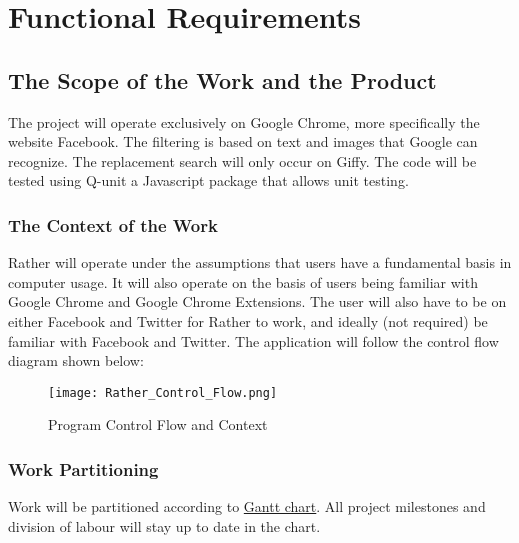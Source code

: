 \documentclass[12pt, titlepage]{article}
\begin{document}
\section{Functional Requirements}


\subsection{The Scope of the Work and the Product}
The project will operate exclusively on Google Chrome, more specifically the website Facebook. The filtering is based on text and images that Google can recognize. The replacement search will only occur on Giffy. The code will be tested using Q-unit a Javascript package that allows unit testing.

\subsubsection{The Context of the Work}
Rather will operate under the assumptions that users have a fundamental basis in computer usage. It will also operate on the basis of users being familiar with Google Chrome and Google Chrome Extensions. The user will also have to be on either Facebook and Twitter for Rather to work, and ideally (not required) be familiar with Facebook and Twitter. The application will follow the control flow diagram shown below:
\begin{figure}
  \texttt{[image: Rather\_Control\_Flow.png]}
  \caption{Program Control Flow and Context}
  \label{fig:Control Flow Diagram}
\end{figure}


\subsubsection{Work Partitioning}
Work will be partitioned according to \href{../DevelopmentPlan/Dev_Plan_Rev0.gan}{Gantt chart}. All project milestones and division of labour will stay up to date in the chart.
\end{document}
